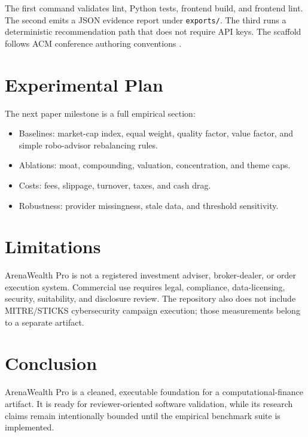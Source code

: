 \documentclass[sigconf,review,anonymous]{acmart}
\begin{document}
The first command validates lint, Python tests, frontend build, and frontend
lint. The second emits a JSON evidence report under \texttt{exports/}. The third
runs a deterministic recommendation path that does not require API keys. The
scaffold follows ACM conference authoring conventions \cite{acmAuthorSubmissions}.

\section{Experimental Plan}

The next paper milestone is a full empirical section:

\begin{itemize}
  \item Baselines: market-cap index, equal weight, quality factor, value factor,
  and simple robo-advisor rebalancing rules.
  \item Ablations: moat, compounding, valuation, concentration, and theme caps.
  \item Costs: fees, slippage, turnover, taxes, and cash drag.
  \item Robustness: provider missingness, stale data, and threshold sensitivity.
\end{itemize}

\section{Limitations}

ArenaWealth Pro is not a registered investment adviser, broker-dealer, or order
execution system. Commercial use requires legal, compliance, data-licensing,
security, suitability, and disclosure review. The repository also does not
include MITRE/STICKS cybersecurity campaign execution; those measurements belong
to a separate artifact.

\section{Conclusion}

ArenaWealth Pro is a cleaned, executable foundation for a computational-finance
artifact. It is ready for reviewer-oriented software validation, while its
research claims remain intentionally bounded until the empirical benchmark suite
is implemented.



\end{document}
